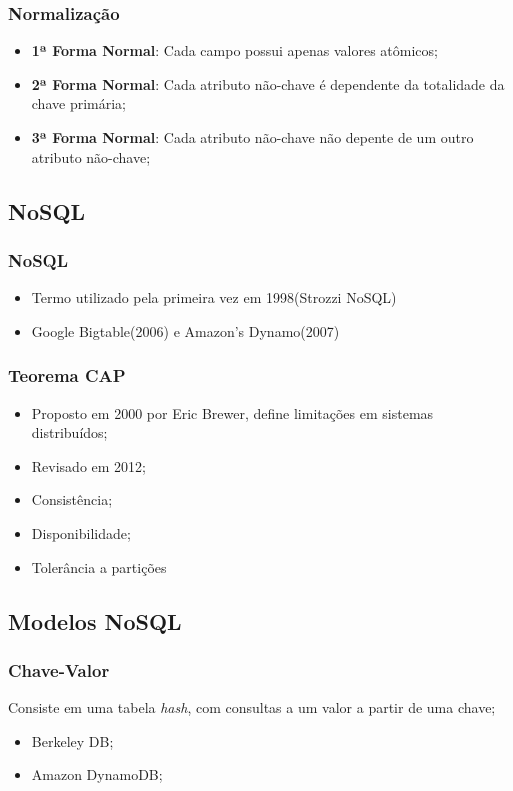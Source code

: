 \documentclass[brazil]{beamer}
\begin{document}
\begin{frame}
\frametitle{Normalização}
	\begin{itemize}
		\item \textbf{1ª Forma Normal}: Cada campo possui apenas valores atômicos;
		\item \textbf{2ª Forma Normal}: Cada atributo não-chave é dependente da totalidade da chave primária;
		\item \textbf{3ª Forma Normal}: Cada atributo não-chave não depente de um outro atributo não-chave;
	\end{itemize}
\end{frame}

\subsection{NoSQL}

\begin{frame}
\frametitle{NoSQL}
	\begin{itemize}
		\item Termo utilizado pela primeira vez em 1998(Strozzi NoSQL)
		\item Google Bigtable(2006) e Amazon's Dynamo(2007)
	\end{itemize}
\end{frame}


\begin{frame}
	\frametitle{Teorema CAP}
	\begin{itemize}
		\item Proposto em 2000 por Eric Brewer, define limitações em sistemas distribuídos;
		\item Revisado em 2012;
		\item Consistência;
		\item Disponibilidade;
		\item Tolerância a partições
	\end{itemize}
\end{frame}

\subsection{Modelos NoSQL}
\begin{frame}
	\frametitle{Chave-Valor}
		Consiste em uma tabela \emph{hash}, com consultas a um valor a partir de uma chave;
		\begin{itemize}
			\item Berkeley DB;
			\item Amazon DynamoDB;
		\end{itemize}
\end{frame}
\end{document}
